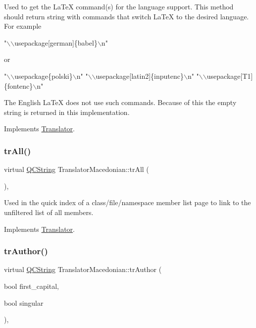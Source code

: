Used to get the La\+TeX command(s) for the language support. This method should return string with commands that switch La\+TeX to the desired language. For example 
\begin{DoxyPre}"\(\backslash\)\(\backslash\)usepackage[german]\{babel\}\(\backslash\)n"
 \end{DoxyPre}
 or 
\begin{DoxyPre}"\(\backslash\)\(\backslash\)usepackage\{polski\}\(\backslash\)n"
 "\(\backslash\)\(\backslash\)usepackage[latin2]\{inputenc\}\(\backslash\)n"
 "\(\backslash\)\(\backslash\)usepackage[T1]\{fontenc\}\(\backslash\)n"
 \end{DoxyPre}


The English La\+TeX does not use such commands. Because of this the empty string is returned in this implementation. 

Implements \mbox{\hyperlink{class_translator}{Translator}}.

\mbox{\label{class_translator_macedonian_a0be55ab06443dfeb9b6774ba49f7d1d0}} 
\subsubsection{\texorpdfstring{trAll()}{trAll()}}
{\footnotesize\ttfamily virtual \mbox{\hyperlink{class_q_c_string}{Q\+C\+String}} Translator\+Macedonian\+::tr\+All (\begin{DoxyParamCaption}{ }\end{DoxyParamCaption})\hspace{0.3cm}{\ttfamily [inline]}, {\ttfamily [virtual]}}

Used in the quick index of a class/file/namespace member list page to link to the unfiltered list of all members. 

Implements \mbox{\hyperlink{class_translator}{Translator}}.

\mbox{\label{class_translator_macedonian_a84dc675a790c1757d12f9795efa995cf}} 
\subsubsection{\texorpdfstring{trAuthor()}{trAuthor()}}
{\footnotesize\ttfamily virtual \mbox{\hyperlink{class_q_c_string}{Q\+C\+String}} Translator\+Macedonian\+::tr\+Author (\begin{DoxyParamCaption}\item[{bool}]{first\+\_\+capital,  }\item[{bool}]{singular }\end{DoxyParamCaption})\hspace{0.3cm}{\ttfamily [inline]}, {\ttfamily [virtual]}}

